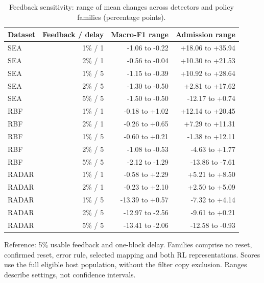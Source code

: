 \begin{table}[htbp]
\centering\small\singlespacing
\caption{Feedback sensitivity: range of mean changes across detectors and policy families (percentage points).}\label{tab:feedback}
\setlength{\tabcolsep}{4pt}
\renewcommand{\arraystretch}{1.18}
\begin{tabular}{@{}lrrr@{}}
\toprule
Dataset & Feedback / delay & Macro-F1 range & Admission range \\
\midrule
SEA & 1\% / 1 & -1.06 to -0.22 & +18.06 to +35.94 \\
SEA & 2\% / 1 & -0.56 to -0.04 & +10.30 to +21.53 \\
SEA & 1\% / 5 & -1.15 to -0.39 & +10.92 to +28.64 \\
SEA & 2\% / 5 & -1.30 to -0.50 & +2.81 to +17.62 \\
SEA & 5\% / 5 & -1.50 to -0.50 & -12.17 to +0.74 \\
RBF & 1\% / 1 & -0.18 to +1.02 & +12.14 to +20.45 \\
RBF & 2\% / 1 & -0.26 to +0.65 & +7.29 to +11.31 \\
RBF & 1\% / 5 & -0.60 to +0.21 & -1.38 to +12.11 \\
RBF & 2\% / 5 & -1.08 to -0.53 & -4.63 to +1.77 \\
RBF & 5\% / 5 & -2.12 to -1.29 & -13.86 to -7.61 \\
RADAR & 1\% / 1 & -0.58 to +2.29 & +5.21 to +8.50 \\
RADAR & 2\% / 1 & -0.23 to +2.10 & +2.50 to +5.09 \\
RADAR & 1\% / 5 & -13.39 to +0.57 & -7.32 to +4.14 \\
RADAR & 2\% / 5 & -12.97 to -2.56 & -9.61 to +0.21 \\
RADAR & 5\% / 5 & -13.41 to -2.06 & -12.58 to -0.93 \\
\bottomrule
\end{tabular}
\par\smallskip\begin{minipage}{\textwidth}\footnotesize Reference: 5\% usable feedback and one-block delay. Families comprise no reset, confirmed reset, error rule, selected mapping and both RL representations. Scores use the full eligible host population, without the filter copy exclusion. Ranges describe settings, not confidence intervals.\end{minipage}
\end{table}
